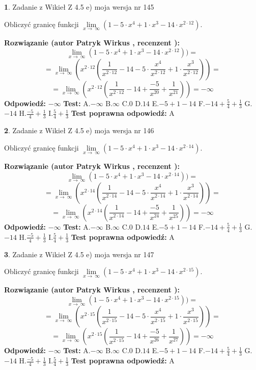\documentclass[12pt, a4paper]{article}
\theoremstyle{definition} %
\newtheorem{zad}{}
\newcommand{\zadStart}[1]{\begin{zad}#1\newline}
\newcommand{\zadStop}{\end{zad}}
\newcommand{\rozwStart}[2]{\noindent \textbf{Rozwiązanie (autor #1 , recenzent #2): }\newline}
\newcommand{\rozwStop}{\newline}
\newcommand{\odpStart}{\noindent \textbf{Odpowiedź:}\newline}
\newcommand{\odpStop}{\newline}
\newcommand{\testStart}{\noindent \textbf{Test:}\newline}
\newcommand{\testStop}{\newline}
\newcommand{\kluczStart}{\noindent \textbf{Test poprawna odpowiedź:}\newline}
\newcommand{\kluczStop}{\newline}
\begin{document}
\zadStart{Zadanie z Wikieł Z 4.5 e) moja wersja nr 145}



Obliczyć granicę funkcji  $\lim\limits_{x\to\ \infty}(1 - 5 \cdot x^{4}+1 \cdot x^{3}- 14 \cdot x^{2\cdot12})$.
\zadStop
\rozwStart{Patryk Wirkus}{}
$$\lim\limits_{x\to\ \infty}(1 - 5 \cdot x^{4}+1 \cdot x^{3}- 14 \cdot x^{2\cdot12}))=$$
$$=\lim\limits_{x\to\ \infty}(x^{2\cdot12}(\frac{1}{x^{2\cdot12}}-14 -5 \cdot \frac{x^{4}}{x^{2\cdot12}}+1 \cdot \frac{x^{3}}{x^{2\cdot12}}))=$$
$$=\lim\limits_{x\to\ \infty}(x^{2\cdot12}(\frac{1}{x^{2\cdot12}}-14 + \frac{-5}{x^{20}}+ \frac{1}{x^{21}}))=-\infty$$
\rozwStop
\odpStart
$-\infty$
\odpStop
\testStart
A.$-\infty$ B.$\infty$ C.$0$ D.$14$ E.$-5 + 1 - 14$
F.$-14+\frac{5}{4}+\frac{1}{3}$ G.$-14$
H.$\frac{-5}{4}+\frac{1}{3}$
I.$\frac{5}{4}+\frac{1}{3}$
\testStop
\kluczStart
A
\kluczStop



\zadStart{Zadanie z Wikieł Z 4.5 e) moja wersja nr 146}



Obliczyć granicę funkcji  $\lim\limits_{x\to\ \infty}(1 - 5 \cdot x^{4}+1 \cdot x^{3}- 14 \cdot x^{2\cdot14})$.
\zadStop
\rozwStart{Patryk Wirkus}{}
$$\lim\limits_{x\to\ \infty}(1 - 5 \cdot x^{4}+1 \cdot x^{3}- 14 \cdot x^{2\cdot14}))=$$
$$=\lim\limits_{x\to\ \infty}(x^{2\cdot14}(\frac{1}{x^{2\cdot14}}-14 -5 \cdot \frac{x^{4}}{x^{2\cdot14}}+1 \cdot \frac{x^{3}}{x^{2\cdot14}}))=$$
$$=\lim\limits_{x\to\ \infty}(x^{2\cdot14}(\frac{1}{x^{2\cdot14}}-14 + \frac{-5}{x^{24}}+ \frac{1}{x^{25}}))=-\infty$$
\rozwStop
\odpStart
$-\infty$
\odpStop
\testStart
A.$-\infty$ B.$\infty$ C.$0$ D.$14$ E.$-5 + 1 - 14$
F.$-14+\frac{5}{4}+\frac{1}{3}$ G.$-14$
H.$\frac{-5}{4}+\frac{1}{3}$
I.$\frac{5}{4}+\frac{1}{3}$
\testStop
\kluczStart
A
\kluczStop



\zadStart{Zadanie z Wikieł Z 4.5 e) moja wersja nr 147}



Obliczyć granicę funkcji  $\lim\limits_{x\to\ \infty}(1 - 5 \cdot x^{4}+1 \cdot x^{3}- 14 \cdot x^{2\cdot15})$.
\zadStop
\rozwStart{Patryk Wirkus}{}
$$\lim\limits_{x\to\ \infty}(1 - 5 \cdot x^{4}+1 \cdot x^{3}- 14 \cdot x^{2\cdot15}))=$$
$$=\lim\limits_{x\to\ \infty}(x^{2\cdot15}(\frac{1}{x^{2\cdot15}}-14 -5 \cdot \frac{x^{4}}{x^{2\cdot15}}+1 \cdot \frac{x^{3}}{x^{2\cdot15}}))=$$
$$=\lim\limits_{x\to\ \infty}(x^{2\cdot15}(\frac{1}{x^{2\cdot15}}-14 + \frac{-5}{x^{26}}+ \frac{1}{x^{27}}))=-\infty$$
\rozwStop
\odpStart
$-\infty$
\odpStop
\testStart
A.$-\infty$ B.$\infty$ C.$0$ D.$14$ E.$-5 + 1 - 14$
F.$-14+\frac{5}{4}+\frac{1}{3}$ G.$-14$
H.$\frac{-5}{4}+\frac{1}{3}$
I.$\frac{5}{4}+\frac{1}{3}$
\testStop
\kluczStart
A
\kluczStop
\end{document}
